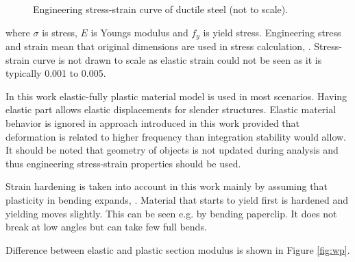 \begin{figure}[htb!]
\centering
{}
\caption{Engineering stress-strain curve of ductile steel (not to scale).}
\label{fig:sscurve}
\end{figure}

where $\sigma$ is stress, $E$ is Youngs modulus and $f_y$ is yield stress.
Engineering stress and strain mean that original dimensions are used in stress calculation,
\citet[p.~108]{dowling}.
Stress-strain curve is not drawn to scale as elastic strain could not be seen as it is typically 0.001 to 0.005.

In this work elastic-fully plastic material model is used in most scenarios.
Having elastic part allows elastic displacements for slender structures. 
Elastic material behavior is ignored in approach introduced in this work provided
that deformation is related to higher frequency
than integration stability would allow.
It should be noted that geometry
of objects is not updated during analysis and thus engineering stress-strain properties should
be used.

Strain hardening is taken into account in this work mainly by assuming that plasticity in bending
expands, \citet[p.~672]{dowling}.
Material that starts to yield first is hardened and yielding moves slightly.
This can be seen e.g. by bending paperclip. It does not break at low angles but can take few full bends. 

Difference between elastic and plastic section modulus is shown in Figure \ref{fig:wp}.

